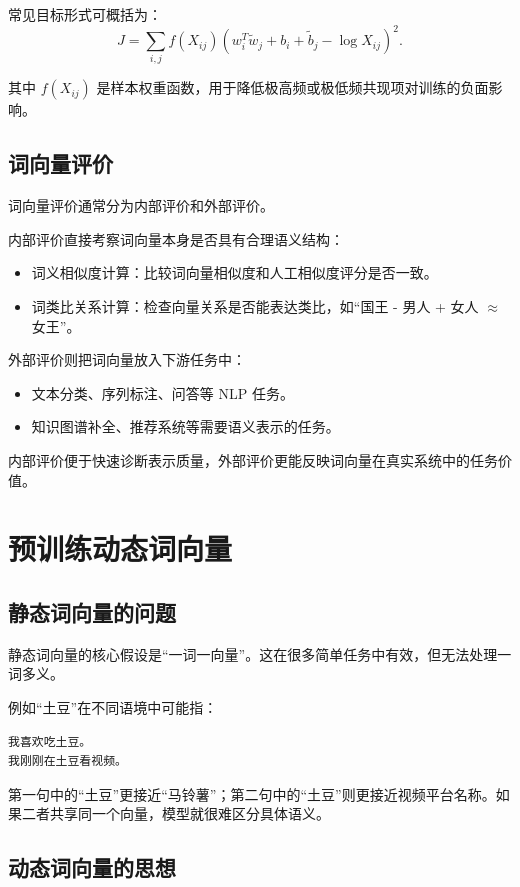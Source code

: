 常见目标形式可概括为：
\[
  J = \sum_{i,j} f(X_{ij})
  \left(w_i^T \tilde{w}_j + b_i + \tilde{b}_j - \log X_{ij}\right)^2.
\]

其中 $f(X_{ij})$ 是样本权重函数，用于降低极高频或极低频共现项对训练的负面影响。

\subsection{词向量评价}

词向量评价通常分为内部评价和外部评价。

内部评价直接考察词向量本身是否具有合理语义结构：
\begin{itemize}
  \item 词义相似度计算：比较词向量相似度和人工相似度评分是否一致。
  \item 词类比关系计算：检查向量关系是否能表达类比，如“国王 - 男人 + 女人 $\approx$ 女王”。
\end{itemize}

外部评价则把词向量放入下游任务中：
\begin{itemize}
  \item 文本分类、序列标注、问答等 NLP 任务。
  \item 知识图谱补全、推荐系统等需要语义表示的任务。
\end{itemize}

内部评价便于快速诊断表示质量，外部评价更能反映词向量在真实系统中的任务价值。

\section{预训练动态词向量}

\subsection{静态词向量的问题}

静态词向量的核心假设是“一词一向量”。这在很多简单任务中有效，但无法处理一词多义。

例如“土豆”在不同语境中可能指：
\begin{Verbatim}[breaklines=true]
我喜欢吃土豆。
我刚刚在土豆看视频。
\end{Verbatim}

第一句中的“土豆”更接近“马铃薯”；第二句中的“土豆”则更接近视频平台名称。如果二者共享同一个向量，模型就很难区分具体语义。

\subsection{动态词向量的思想}

